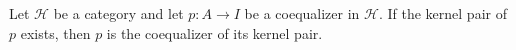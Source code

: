 Let $\mathcal{H}$ be a category and let $p: A \longrightarrow I$ be a coequalizer in $\mathcal{H}$. If the kernel pair of $p$ exists, then $p$ is the coequalizer of its kernel pair.
